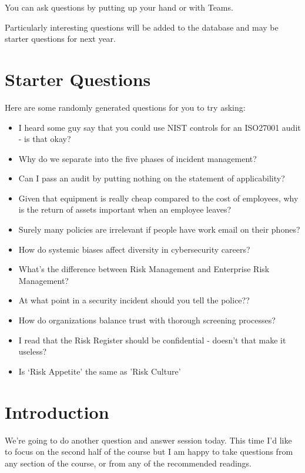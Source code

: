 \documentclass[12pt]{article}
\begin{document}
You can ask questions by putting up your hand or with Teams.  

Particularly interesting questions will be added to the database and may be starter questions for next year.  

\section*{Starter Questions} 
Here are some randomly generated questions for you to try asking: 

\begin{itemize}
  \item I heard some guy say that you could use NIST controls for an ISO27001 audit - is that okay?
  \item Why do we separate into the five phases of incident management?
  \item Can I pass an audit by putting nothing on the statement of applicability?
  \item Given that equipment is really cheap compared to the cost of employees, why is the return of assets important when an employee leaves?
  \item Surely many policies are irrelevant if people have work email on their phones?
  \item How do systemic biases affect diversity in cybersecurity careers?
  \item What's the difference between Risk Management and Enterprise Risk Management?
  \item At what point in a security incident should you tell the police??
  \item How do organizations balance trust with thorough screening processes?
  \item I read that the Risk Register should be confidential - doesn't that make it useless?
  \item Is `Risk Appetite' the same as 'Risk Culture'
\end{itemize}


%
%



\maketitle

\section*{Introduction}
We're going to do another question and answer session today. This time I'd like to focus on the second half of the course but I am happy to take questions from any section of the course, or from any of the recommended readings. 
\end{document}
